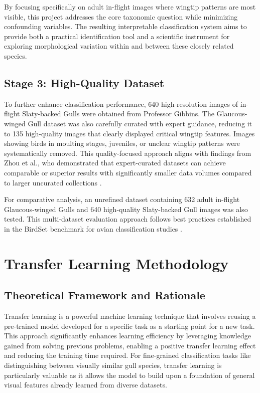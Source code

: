 \documentclass[a4paper,12pt]{article}
\begin{document}
By focusing specifically on adult in-flight images where wingtip patterns are most visible, this project addresses the core taxonomic question while minimizing confounding variables. The resulting interpretable classification system aims to provide both a practical identification tool and a scientific instrument for exploring morphological variation within and between these closely related species.

\subsection{Stage 3: High-Quality Dataset}

To further enhance classification performance, 640 high-resolution images of in-flight Slaty-backed Gulls were obtained from Professor Gibbins. The Glaucous-winged Gull dataset was also carefully curated with expert guidance, reducing it to 135 high-quality images that clearly displayed critical wingtip features. Images showing birds in moulting stages, juveniles, or unclear wingtip patterns were systematically removed. This quality-focused approach aligns with findings from Zhou et al., who demonstrated that expert-curated datasets can achieve comparable or superior results with significantly smaller data volumes compared to larger uncurated collections \citet{zhou2022}.

For comparative analysis, an unrefined dataset containing 632 adult in-flight Glaucous-winged Gulls and 640 high-quality Slaty-backed Gull images was also tested. This multi-dataset evaluation approach follows best practices established in the BirdSet benchmark for avian classification studies \citet{birdset2023}.

\section{Transfer Learning Methodology}

\subsection{Theoretical Framework and Rationale}

Transfer learning is a powerful machine learning technique that involves reusing a pre-trained model developed for a specific task as a starting point for a new task. This approach significantly enhances learning efficiency by leveraging knowledge gained from solving previous problems, enabling a positive transfer learning effect and reducing the training time required. For fine-grained classification tasks like distinguishing between visually similar gull species, transfer learning is particularly valuable as it allows the model to build upon a foundation of general visual features already learned from diverse datasets.
\end{document}
